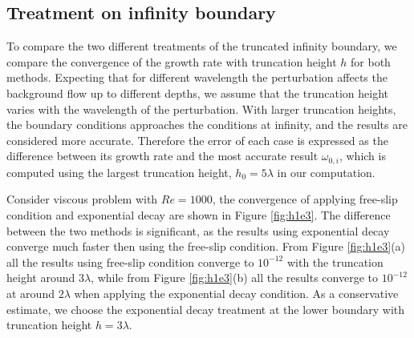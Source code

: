 \subsection{Treatment on infinity boundary}
To compare the two different treatments of the truncated infinity boundary, we compare the convergence of the growth rate with truncation height $h$ for both methods. Expecting that for different wavelength the perturbation affects the background flow up to different depths, we assume that the truncation height varies with the wavelength of the perturbation. With larger truncation heights, the boundary conditions approaches the conditions at infinity, and the results are considered more accurate. Therefore the error of each case is expressed as the difference between its growth rate and the most accurate result $\omega_{0,i}$, which is computed using the largest truncation height, $h_0=5\lambda$ in our computation.

Consider viscous problem with $Re=1000$, the convergence of applying free-slip condition and exponential decay are shown in Figure \ref{fig:h1e3}. The difference between the two methods is significant, as the results using exponential decay converge much faster then using the free-slip condition. From Figure \ref{fig:h1e3}(a) all the results using free-slip condition converge to $10^{-12}$ with the truncation height around $3\lambda$, while from Figure \ref{fig:h1e3}(b) all the results converge to $10^{-12}$ at around $2\lambda$ when applying the exponential decay condition. As a conservative estimate, we choose the exponential decay treatment at the lower boundary with truncation height $h=3\lambda$.

